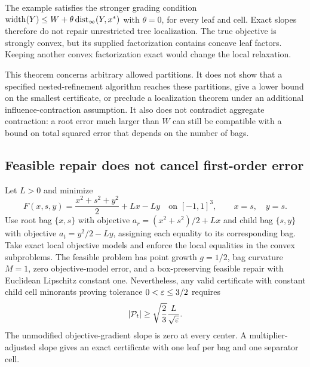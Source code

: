 The example satisfies the stronger grading condition
$\operatorname{width}(Y)\le W+\theta\operatorname{dist}_\infty(Y,x^*)$ with $\theta=0$, for
every leaf and cell. Exact slopes therefore do not repair unrestricted
tree localization. The true objective is strongly convex, but its supplied
factorization contains concave leaf factors. Keeping another convex
factorization exact would change the local relaxation.

This theorem concerns arbitrary allowed partitions. It does not show that
a specified nested-refinement algorithm reaches these partitions, give a
lower bound on the smallest certificate, or preclude a localization theorem
under an additional influence-contraction assumption. It also does not
contradict aggregate contraction: a root error much larger than $W$ can
still be compatible with a bound on total squared error that depends on the
number of bags.

\subsection{Feasible repair does not cancel first-order error}
\label{sec:limitations-constraint}

\begin{proposition}
\label{prop:limitations-constraint}
Let $L>0$ and minimize
\[
 F(x,s,y)=\frac{x^2+s^2+y^2}{2}+Lx-Ly
 \quad\text{on }[-1,1]^3,\qquad x=s,\quad y=s.
\]
Use root bag $\{x,s\}$ with objective
$a_r=(x^2+s^2)/2+Lx$ and child bag $\{s,y\}$ with objective
$a_t=y^2/2-Ly$, assigning each equality to its corresponding bag.
Take exact local objective models and enforce the local equalities in
the convex subproblems. The feasible problem has point growth $g=1/2$,
bag curvature $M=1$, zero objective-model error, and a box-preserving
feasible repair with Euclidean Lipschitz constant one. Nevertheless,
any valid certificate with constant child cell minorants proving
tolerance $0<\varepsilon\le3/2$ requires
\begin{equation}\label{eq:limitations-constraint-count}
 |\mathcal P_t|\ge\sqrt{\frac23}\frac L{\sqrt{\varepsilon}}.
\end{equation}
The unmodified objective-gradient slope is zero at every center. A
multiplier-adjusted slope gives an exact certificate with one leaf per
bag and one separator cell.
\end{proposition}

